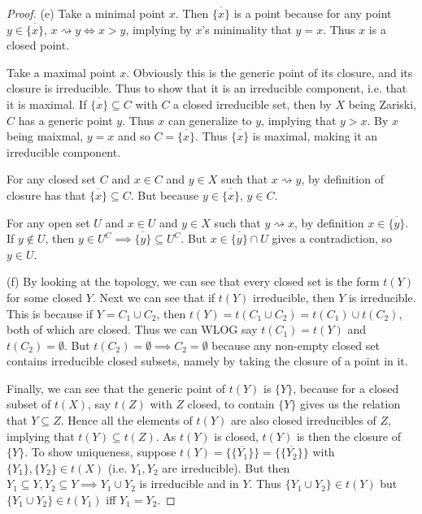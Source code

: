 \begin{proof}
	(e) Take a minimal point $x $.
	Then $\overline{\{x\}  }  $ is a point because for any point $y\in \overline{\{x\}  }  $, $x\rightsquigarrow y \iff x > y$, implying by $x $'s minimality that $y =x$.
	Thus $x $ is a closed point.

	Take a maximal point $x $.
	Obviously this is the generic point of its closure, and its closure is irreducible.
	Thus to show that it is an irreducible component, i.e. that it is maximal.
	If $\overline{\{x\}  } \subseteq C   $ with $C$ a closed irreducible set, then by $X $ being Zariski, $C $ has a generic point $y $.
	Thus $x $ can generalize to $y $, implying that $y > x $.
	By $x $ being maixmal, $y=x $ and so $C = \overline{\{x\}  }  $.
	Thus $\overline{\{x\} }  $ is maximal, making it an irreducible component.

	For any closed set $C $ and $x\in C $ and $y\in X $ such that $x\rightsquigarrow y $, by definition of closure has that $\overline{\{x\}  } \subseteq C  $.
	But because $y \in \overline{\{x\} }  $, $y \in C $.

	For any open set $U $ and $x\in U $ and $y\in X $ such that $y \rightsquigarrow x $, by definition $x\in \overline{\{y\} }  $.
	If $y\notin U $, then $y\in U^C \implies \overline{\{y\}  } \subseteq U^C  $.
	But $x\in \overline{\{y\}  }  \cap U$ gives a contradiction, so $y\in U $.

	(f) By looking at the topology, we can see that every closed set is the form $t(Y) $ for some closed $Y $.
	Next we can see that if $t(Y) $ irreducible, then $Y $ is irreducible.
	This is because if $Y = C_{1}\cup C_{2} $, then $t(Y) = t(C_{1}\cup C_{2}) = t(C_{1}) \cup t(C_{2}) $, both of which are closed.
	Thus we can WLOG say $t(C_{1}) = t(Y)$ and $t(C_{2}) = \emptyset $.
	But $t(C_{2}) = \emptyset \implies C_{2}=\emptyset $ because any non-empty closed set contains irreducible closed subsets, namely by taking the closure of a point in it.

	Finally, we can see that the generic point of $t(Y) $ is $\{Y\}   $, because for a closed subset of $t(X) $, say $t(Z) $ with $Z $ closed, to contain $\{Y\}   $ gives us the relation that $Y \subseteq Z $.
	Hence all the elements of $t(Y) $ are also closed irreducibles of $Z $, implying that $t(Y) \subseteq t(Z) $.
	As $t(Y) $ is closed, $t(Y) $ is then the closure of $\{Y\}   $.
	To show uniqueness, suppose $t(Y) = \overline{\{\{Y_{1}\}\} } = \overline{\{\{Y_{2}\}\}  }$ with $\{Y_{1}\}, \{Y_{2}\} \in t(X)$ (i.e. $Y_{1},Y_{2} $ are irreducible).
	But then $Y_{1} \subseteq Y, Y_{2} \subseteq Y \implies Y_{1}\cup Y_{2}$ is irreducible and in $Y $.
	Thus $\{Y_{1}\cup Y_{2}\} \in t(Y)$ but $\{Y_{1}\cup Y_{2}\} \in t(Y_{1})  $ iff $Y_{1}=Y_{2} $.


\end{proof}
